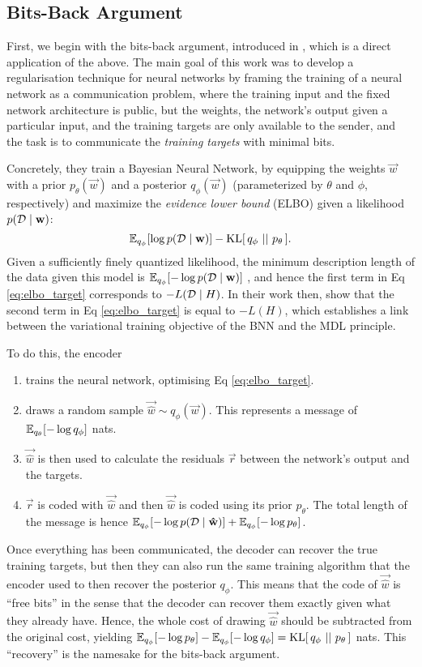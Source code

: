 \subsection{Bits-Back Argument}
First, we begin with the bits-back argument, introduced in
\cite{hinton1993keeping}, which is a direct application of the above. The main
goal of this work was to develop a regularisation technique for neural networks
by framing the training of a neural network as a communication problem, where
the training input and the fixed network architecture is public, but the weights,
the network's output given a particular input, and the training targets are
only available to the sender, and the task is to communicate the
\textit{training targets} with minimal bits.
\par
Concretely, they train a Bayesian Neural Network, by equipping the weights
$\vec{w}$ with a prior $p_\theta(\vec{w})$ and a posterior $q_\phi(\vec{w})$
(parameterized by $\theta$ and $\phi$, respectively) and maximize
the \textit{evidence lower bound} (ELBO) given a likelihood $p(\mathcal{D} \mid \mathbf{w})$:
\begin{equation}
  \label{eq:elbo_target}
  \mathbb{E}_{q_\phi}[\log p(\mathcal{D} \mid \mathbf{w})] - \mathrm{KL}[\,q_{\phi}\,\,||\,\,p_{\theta}\,].
\end{equation}
Given a sufficiently finely quantized likelihood, the minimum description length
of the data given this model is $\mathbb{E}_{q_\phi}[-\log p(\mathcal{D} \mid \mathbf{w})]$
\cite{shannon1998mathematical}, and hence the first term in Eq
\ref{eq:elbo_target} corresponds to $-L(\mathcal{D} \mid H)$. In their work then,
\cite{hinton1993keeping} show that the second term in Eq \ref{eq:elbo_target}
is equal to $-L(H)$, which establishes a link between the variational training
objective of the BNN and the MDL principle.
\par
To do this, the encoder
\begin{enumerate}
\item trains the neural network, optimising Eq \ref{eq:elbo_target}.
\item draws a random sample $\vec{\hat{w}} \sim q_{\phi}(\vec{w})$. This
  represents a message of $\mathbb{E}_{q_\theta}[- \log q_\phi]$ nats.
\item $\vec{\hat{w}}$ is then used to calculate the residuals $\vec{r}$ between
  the network's output and the targets.
\item $\vec{r}$ is coded with $\vec{\hat{w}}$ and then $\vec{\hat{w}}$ is coded
  using its prior $p_\theta$. The total length of the message is hence $\mathbb{E}_{q_\phi}[-\log
  p(\mathcal{D} \mid \mathbf{\hat{w}})] + \mathbb{E}_{q_\phi}[-\log p_{\theta}]$.
\end{enumerate}
Once everything has been communicated, the decoder can recover the true training
targets, but then they can also run the same training algorithm that the encoder
used to then recover the posterior $q_\phi$. This means that the code of
$\vec{\hat{w}}$ is ``free bits'' in the sense that the decoder can recover them
exactly given what they already have. 
Hence, the whole cost of drawing $\vec{\hat{w}}$ should be
subtracted from the original cost, yielding
$\mathbb{E}_{q_\phi}[-\log p_{\theta}] - \mathbb{E}_{q_\phi}[-\log q_{\phi}] =
\mathrm{KL}[\,q_{\phi}\,\,||\,\,p_\theta\,]$ nats. This ``recovery'' is the namesake for the
bits-back argument.
